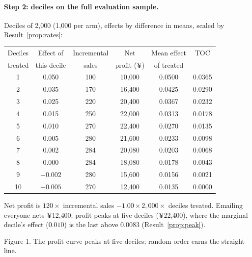 \documentclass[11pt]{article}
\begin{document}
\paragraph{Step 2: deciles on the full evaluation sample.} Deciles of 2{,}000 (1{,}000 per arm), effects by difference
in means, scaled by Result~\ref{prop:rates}:
\begin{center}
\begin{tabular}{cccccc}
\toprule
Deciles & Effect of & Incremental & Net & Mean effect & TOC \\
treated & this decile & sales & profit (¥) & of treated & \\
\midrule
1 & 0.050 & 100 & 10{,}000 & 0.0500 & 0.0365 \\
2 & 0.035 & 170 & 16{,}400 & 0.0425 & 0.0290 \\
3 & 0.025 & 220 & 20{,}400 & 0.0367 & 0.0232 \\
4 & 0.015 & 250 & 22{,}000 & 0.0313 & 0.0178 \\
5 & 0.010 & 270 & 22{,}400 & 0.0270 & 0.0135 \\
6 & 0.005 & 280 & 21{,}600 & 0.0233 & 0.0098 \\
7 & 0.002 & 284 & 20{,}080 & 0.0203 & 0.0068 \\
8 & 0.000 & 284 & 18{,}080 & 0.0178 & 0.0043 \\
9 & $-0.002$ & 280 & 15{,}600 & 0.0156 & 0.0021 \\
10 & $-0.005$ & 270 & 12{,}400 & 0.0135 & 0.0000 \\
\bottomrule
\end{tabular}
\end{center}
Net profit is $120 \times$ incremental sales $- 1.00 \times 2{,}000 \times$ deciles treated. Emailing everyone nets ¥12{,}400;
profit peaks at five deciles (¥22{,}400), where the marginal decile's effect ($0.010$) is the last above $0.0083$
(Result~\ref{prop:peak}).

\begin{center}

\small Figure 1. The profit curve peaks at five deciles; random order earns the straight line.
\end{center}
\end{document}

